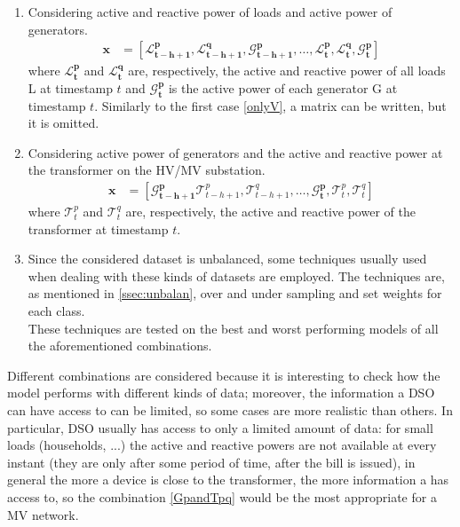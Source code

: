 \begin{enumerate}[label=\textbf{\roman*)}]
    \item \label{LpqandGp} Considering active and reactive power of loads and active power of generators.
    \begin{equation}
      \begin{aligned}
        \textbf{x}  &= [
            \mathbf{\mathcal{L}^p_{t-h+1}}, \mathbf{\mathcal{L}^q_{t-h+1}}, \mathbf{\mathcal{G}^p_{t-h+1}},
            \dots,
            \mathbf{\mathcal{L}^p_{t}}, 
            \mathbf{\mathcal{L}^q_{t}}, 
            \mathbf{\mathcal{G}^p_{t}}]
      \end{aligned}
    \end{equation}
    \noindent where $\mathbf{\mathcal{L}^p_{t}}$ and $\mathbf{\mathcal{L}^q_{t}}$ are, respectively, the active and reactive power of all loads \gls{L} at timestamp $t$ and $\mathbf{\mathcal{G}^p_{t}}$ is the active power of each generator \gls{G} at timestamp $t$. Similarly to the first case \ref{onlyV}, a matrix can be written, but it is omitted.
    
    \item \label{GpandTpq} Considering active power of generators and the active and reactive power at the transformer on the HV/MV substation.
    \begin{equation}
      \begin{aligned}
        \textbf{x}  &= [
            \mathbf{\mathcal{G}^p_{t-h+1}}
            \mathcal{T}^p_{t-h+1},
            \mathcal{T}^q_{t-h+1}, 
            \dots,
            \mathbf{\mathcal{G}^p_{t}}, 
            \mathcal{T}^p_{t}, 
            \mathcal{T}^q_{t}]
      \end{aligned}
    \end{equation}
    \noindent where $\mathcal{T}^p_{t}$ and $\mathcal{T}^q_{t}$ are, respectively, the active and reactive power of the transformer at timestamp $t$.
    
    \item \label{case4} Since the considered dataset is unbalanced, some techniques usually used when dealing with these kinds of datasets are employed. The techniques are, as mentioned in \ref{ssec:unbalan}, over and under sampling and set weights for each class.\\
    These techniques are tested on the best and worst performing models of all the aforementioned combinations.
\end{enumerate}
\noindent Different combinations are considered because it is interesting to check how the model performs with different kinds of data; moreover, the information a \gls{DSO} can have access to can be limited, so some cases are more realistic than others. In particular, \gls{DSO} usually has access to only a limited amount of data: for small loads (households, ...) the active and reactive powers are not available at every instant (they are only after some period of time, after the bill is issued), in general the more a device is close to the transformer, the more information a  has access to, so the combination \ref{GpandTpq} would be the most appropriate for a MV network.\\


